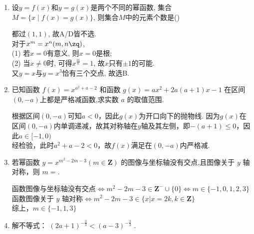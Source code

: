 \begin{enumerate}
    \item 设$y=f(x)$和$y=g(x)$是两个不同的幂函数, 集合$M=\{x\mid f(x)=g(x)\}$, 则集合$M$中的元素个数是\dotfill()
    \begin{jieda}
    都过$(1,1)$, 故A/D皆不选. \\
    对于$x^m=x^n(m,n\zq)$, \\
    (1) 若$x=0$有意义, 则$x=0$是根; \\
    (2) 当$x\neq 0$时, 可得$x^{\frac{m}{n}}=1$, 故$x$只有$\pm1$的可能. \\
    又$y=x$与$y=x^3$恰有三个交点, 故选B.  
    \end{jieda}
    \item 已知函数 $f\left( x\right)  = {x}^{{a}^{2} + a - 2}$ 和函数 $g\left( x\right)  = a{x}^{2} + {2a}\left( {a + 1}\right) x - 1$ 在区间$(0, -a)$上都是严格减函数,求实数 $a$ 的取值范围.
    \begin{jieda}
        根据区间$(0, -a)$可知$a < 0$，因此$g(x)$为开口向下的抛物线. 因为$g(x)$在区间$(0, -a)$内单调递减，故其对称轴在$y$轴及其左侧，即$-(a+1) \leq 0$，因此$a \in [-1, 0)$ \\
        经检验，此时${a}^{2} + a - 2 < 0$，故$f(x)$满足在$(0, -a)$内严格减.
    \end{jieda}
    \item 若幂函数 $y = {x}^{{m}^{2} - {2m} - 3}\left( {m \in  \mathbf{Z}}\right)$ 的图像与坐标轴没有交点,且图像关于 $y$ 轴对称，则 $m=$.
    \begin{jieda}
        函数图像与坐标轴没有交点$\Longleftrightarrow {m}^{2} - {2m} - 3 \in \mathbf{Z^-} \cup \{0\} \Longleftrightarrow m \in \{-1, 0, 1, 2, 3\}$ \\
        函数图像关于 $y$ 轴对称$\Longleftrightarrow {m}^{2} - {2m} - 3 \in \{ x | x = 2k, k \in \mathbf{Z}\}$ \\
        综上，$m \in \{-1, 1, 3\}$
    \end{jieda}
    \item 解不等式： ${\left( 2a + 1\right) }^{-\frac{2}{3}} < {\left( a - 3\right) }^{-\frac{2}{3}}$ .
\end{enumerate}
